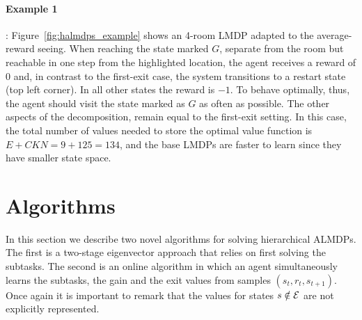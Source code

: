   \paragraph{Example 1}: Figure~\ref{fig:halmdps_example} shows an 4-room LMDP adapted to the average-reward seeing. When reaching the state marked $G$, separate from the room but reachable in one step from the highlighted location, the agent receives a reward of $0$ and, in contrast to the first-exit case, the system transitions to a restart state (top left corner). In all other states the reward is $-1$. To behave optimally, thus, the agent should visit the state marked as $G$ as often as possible. The other aspects of the decomposition, remain equal to the first-exit setting. %
    In this case, the total number of values needed to store the optimal value function is $E+CKN=9+125=134$, and the base LMDPs are faster to learn since they have smaller state space.


\section{Algorithms}
In this section we describe two novel algorithms for solving hierarchical ALMDPs. The first is a two-stage eigenvector approach that relies on first solving the subtasks. The second is an online algorithm in which an agent simultaneously learns the subtasks, the gain and the exit values from samples $(s_t, r_t, s_{t+1})$.
Once again it is important to remark that the values for states $s\notin\mathcal{E}$ are not explicitly represented.

